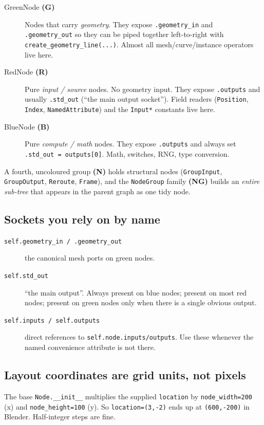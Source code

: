 \documentclass[10pt,a4paper,twocolumn]{article}
\newcommand{\code}[1]{\texttt{\small #1}}
\newcommand{\Gn}{\textcolor{greennode}{\textbf{(G)}}}
\newcommand{\Rn}{\textcolor{rednode}{\textbf{(R)}}}
\newcommand{\Bn}{\textcolor{bluenode}{\textbf{(B)}}}
\newcommand{\Nn}{\textcolor{graynode}{\textbf{(N)}}}
\newcommand{\NGn}{\textcolor{graynode}{\textbf{(NG)}}}
\begin{document}
\begin{description}
\item[\textcolor{greennode}{GreenNode} \Gn] Nodes that carry
  \emph{geometry}. They expose \code{.geometry\_in} and
  \code{.geometry\_out} so they can be piped together left-to-right with
  \code{create\_geometry\_line(...)}. Almost all mesh/curve/instance
  operators live here.
\item[\textcolor{rednode}{RedNode} \Rn] Pure \emph{input / source} nodes.
  No geometry input. They expose \code{.outputs} and usually
  \code{.std\_out} (``the main output socket''). Field readers
  (\code{Position}, \code{Index}, \code{NamedAttribute}) and the
  \code{Input*} constants live here.
\item[\textcolor{bluenode}{BlueNode} \Bn] Pure \emph{compute / math}
  nodes. They expose \code{.outputs} and always set
  \code{.std\_out = outputs[0]}. Math, switches, RNG, type conversion.
\end{description}

A fourth, uncoloured group \Nn{} holds structural nodes
(\code{GroupInput}, \code{GroupOutput}, \code{Reroute}, \code{Frame}), and
the \code{NodeGroup} family \NGn{} builds an \emph{entire sub-tree} that
appears in the parent graph as one tidy node.

\subsection{Sockets you rely on by name}

\begin{description}
\item[\code{self.geometry\_in / .geometry\_out}] the canonical mesh ports
  on green nodes.
\item[\code{self.std\_out}] ``the main output''. Always present on blue
  nodes; present on most red nodes; present on green nodes only when there
  is a single obvious output.
\item[\code{self.inputs / self.outputs}] direct references to
  \code{self.node.inputs/outputs}. Use these whenever the named
  convenience attribute is not there.
\end{description}

\subsection{Layout coordinates are grid units, not pixels}

The base \code{Node.\_\_init\_\_} multiplies the supplied \code{location}
by \code{node\_width=200} (x) and \code{node\_height=100} (y). So
\code{location=(3,-2)} ends up at \code{(600,-200)} in Blender.
Half-integer steps are fine.
\end{document}
